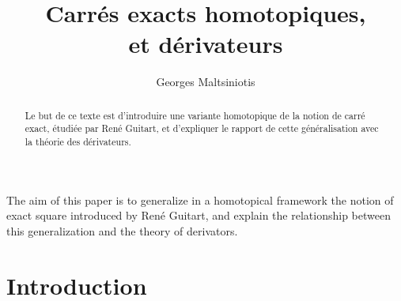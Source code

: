 \documentclass[francais]{smfart}
\author{Georges Maltsiniotis}
\title[Carrés exacts homotopiques, et dérivateurs]{Carrés exacts homotopiques,\\ et dérivateurs}
\theoremstyle{plain}
\theoremstyle{remark}
\theoremstyle{definition}
\numberwithin{equation}{thm}
\begin{document}
\frontmatter

\begin{abstract}
Le but de ce texte est d'introduire une variante homotopique de la notion de carré exact, étudiée par René Guitart, et d'expliquer le rapport de cette généralisation avec la théorie des dérivateurs.
\end{abstract}

\begin{altabstract}
The aim of this paper is to generalize  in a homotopical framework the notion of exact square introduced by René Guitart, and explain the relationship between this generalization and the theory of derivators.
\end{altabstract}


\maketitle
\tableofcontents
\newpage

\mainmatter

\section*{Introduction}
\end{document}
